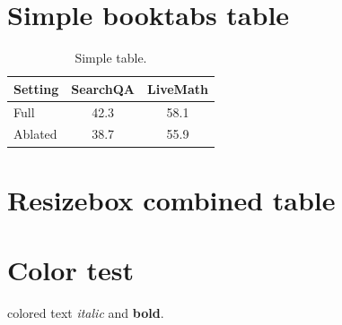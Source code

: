 \documentclass{article}
\begin{document}
\section{Simple booktabs table}

\begin{table}[h]
\centering
\begin{tabular}{lcc}
\toprule
\textbf{Setting} & \textbf{SearchQA} & \textbf{LiveMath} \\
\midrule
Full & 42.3 & 58.1 \\
Ablated & 38.7 & 55.9 \\
\bottomrule
\end{tabular}
\caption{Simple table.}
\label{tab-simple}
\end{table}

\section{Resizebox combined table}

\begin{table}[h]
\centering
\caption{Resizebox combined.}
\label{tab-resize}
\end{table}

\section{Color test}

{\color{CadetBlue} colored text \emph{italic}} and \textbf{bold}.
\end{document}
